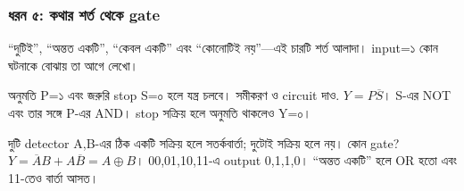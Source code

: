 \subsubsection*{ধরন ৫: কথার শর্ত থেকে gate}
“দুটিই”, “অন্তত একটি”, “কেবল একটি” এবং “কোনোটিই নয়”—এই চারটি শর্ত আলাদা। input=১ কোন ঘটনাকে বোঝায় তা আগে লেখো।
\par\smallskip\noindent\begin{minipage}{\linewidth}
অনুমতি P=১ এবং জরুরি stop S=০ হলে যন্ত্র চলবে। সমীকরণ ও circuit দাও.
\chThreeAnswer $Y=P\overline S$। S-এর NOT এবং তার সঙ্গে P-এর AND। stop সক্রিয় হলে অনুমতি থাকলেও Y=০।
\begin{center}\begin{minipage}{\linewidth}\centering
\begin{chThreeDiagram}\end{chThreeDiagram}
\label{LG003}
\end{minipage}\end{center}

\end{minipage}\par\smallskip
\par\smallskip\noindent\begin{minipage}{\linewidth}
দুটি detector A,B-এর ঠিক একটি সক্রিয় হলে সতর্কবার্তা; দুটোই সক্রিয় হলে নয়। কোন gate?
\chThreeAnswer $Y=\overline AB+A\overline B=A\oplus B$। 00,01,10,11-এ output 0,1,1,0। “অন্তত একটি” হলে OR হতো এবং 11-তেও বার্তা আসত।

\end{minipage}\par\smallskip
{}
